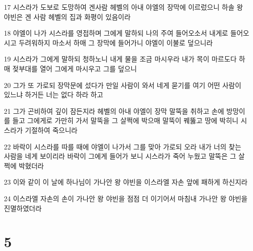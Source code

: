 \par 17 시스라가 도보로 도망하여 겐사람 헤벨의 아내 야엘의 장막에 이르렀으니 하솔 왕 야빈은 겐 사람 헤벨의 집과 화평이 있음이라
\par 18 야엘이 나가 시스라를 영접하며 그에게 말하되 나의 주여 들어오소서 내게로 들어오시고 두려워하지 마소서 하매 그 장막에 들어가니 야엘이 이불로 덮으니라
\par 19 시스라가 그에게 말하되 청하노니 내게 물을 조금 마시우라 내가 목이 마르도다 하매 젖부대를 열어 그에게 마시우고 그를 덮으니
\par 20 그가 또 가로되 장막문에 섰다가 만일 사람이 와서 네게 묻기를 여기 어떤 사람이 있느냐 하거든 너는 없다 하라 하고
\par 21 그가 곤비하여 깊이 잠든지라 헤벨의 아내 야엘이 장막 말뚝을 취하고 손에 방망이를 들고 그에게로 가만히 가서 말뚝을 그 살쩍에 박으매 말뚝이 꿰뚫고 땅에 박히니 시스라가 기절하여 죽으니라
\par 22 바락이 시스라를 따를 때에 야엘이 나가서 그를 맞아 가로되 오라 내가 너의 찾는 사람을 네게 보이리라 바락이 그에게 들어가 보니 시스라가 죽어 누웠고 말뚝은 그 살쩍에 박혔더라
\par 23 이와 같이 이 날에 하나님이 가나안 왕 야빈을 이스라엘 자손 앞에 패하게 하신지라
\par 24 이스라엘 자손의 손이 가나안 왕 야빈을 점점 더 이기어서 마침내 가나안 왕 야빈을 진멸하였더라

\chapter{5}

